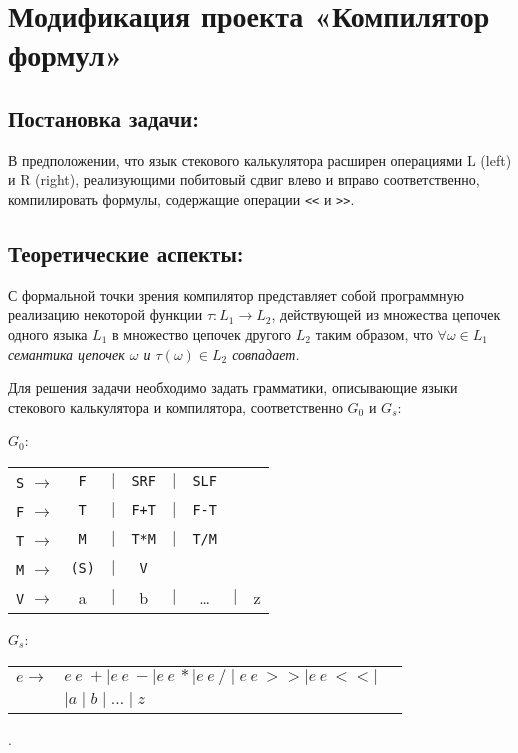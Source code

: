 
\section{Модификация проекта «Компилятор формул»}
\subsection{Постановка задачи:}
В предположении, что язык стекового калькулятора
расширен операциями L (left) и R (right),
реализующими побитовый сдвиг влево и вправо соответственно, компилировать
формулы, содержащие операции \verb|<<| и \verb|>>|.

\subsection{Теоретические аспекты:}
С формальной точки зрения компилятор представляет собой программную реализацию
некоторой функции $\tau\colon L_1 \rightarrow L_2$, действующей из множества
цепочек одного языка $L_1$ в множество цепочек другого $L_2$ таким образом, что
$\forall \omega \in L_1$ {\em семантика цепочек $\omega$ и $\tau(\omega)\in L_2$
 совпадает.}

Для решения задачи необходимо задать грамматики, описывающие языки стекового
калькулятора и компилятора, соответственно $G_0$ и $G_s$:

$G_0$:
\medskip
\noindent\hspace{2cm}
\begin{tabular}{rcccccll}
\verb|S| $\rightarrow$ & \verb|F| &$\mid$& \verb|SRF|&$\mid$&\verb|SLF|\\
\verb|F| $\rightarrow$ & \verb|T| &$\mid$& \verb|F+T|&$\mid$&\verb|F-T|\\
\verb|T| $\rightarrow$ & \verb|M| &$\mid$& \verb|T*M|&$\mid$&\verb|T/M|\\
\verb|M| $\rightarrow$ & \verb|(S)|&$\mid$& \verb|V|\\
\verb|V| $\rightarrow$ & a &$\mid$& b &$\mid$& \dots &$\mid$& z\\
\end{tabular}
\medskip

$G_s$:
\medskip
\noindent\hspace{2cm}
\begin{tabular}{rll}
$e\rightarrow$ & $e~e~+ \mid e~e~-\mid e~e~* \mid e~e~/ \mid e~e~>>\mid e~e~<<\mid$\\
&$\mid a \mid b \mid \dots \mid z$
\end{tabular}

.

